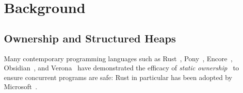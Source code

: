 \section{Background}






\subsection{Ownership and Structured Heaps}

Many 
contemporary programming languages such as
Rust~\cite{RustBook}, Pony~\cite{PonyTS},
Encore~\cite{EncoreTS},
Obsidian~\cite{aldrichObsidianStudy2020}, and
Verona~\cite{Verona} 
have demonstrated the efficacy of \textit{static
  ownership}~\cite{ClaPotNobOOPSLA98,noble_flexible_1998} %
to ensure
concurrent programs are safe: Rust in particular has been adopted by
Microsoft~\cite{RustPopular,MSRust}.

